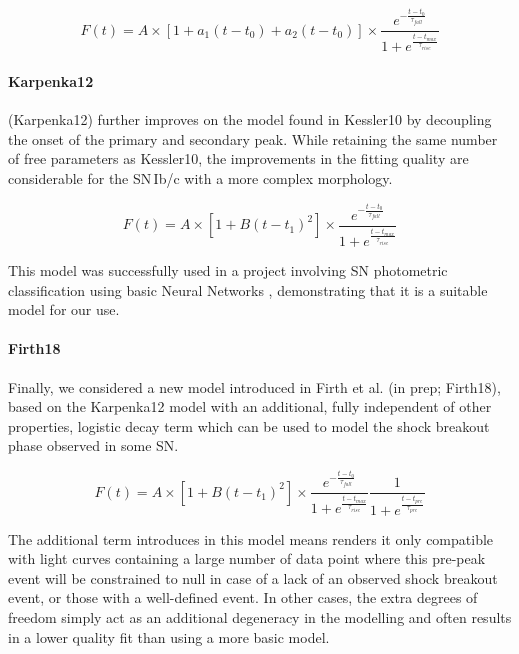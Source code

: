\begin{equation}
  F(t) = A \times [1 + a_1(t - {t_0}) + a_2(t - {t_0})] \times \frac{e^{-\frac{t - t_{0}}{\tau_{fall}}}} {1 + e^{\frac{t - t_{max}}{\tau_{rise}}}}
\end{equation}

\paragraph{Karpenka12}
\citet{Karpenka2012} (Karpenka12) further improves on the model found in Kessler10 by decoupling the onset of the primary and secondary peak. While retaining the same number of free parameters as Kessler10, the improvements in the fitting quality are considerable for the SN\,Ib/c with a more complex morphology.

\begin{equation}
  F(t) = A \times [1 + B(t - {t_1})^2] \times \frac{e^{-\frac{t - t_{0}}{\tau_{fall}}}} {1 + e^{\frac{t - t_{max}}{\tau_{rise}}}}
\end{equation}

This model was successfully used in a project involving SN photometric classification using basic Neural Networks \citep{Karpenka2012}, demonstrating that it is a suitable model for our use.

\paragraph{Firth18}
Finally, we considered a new model introduced in Firth et al. (in prep; Firth18), based on the Karpenka12 model with an additional, fully independent of other properties, logistic decay term which can be used to model the shock breakout phase observed in some SN.

\begin{equation}
  F(t) = A \times [1 + B(t - {t_1})^2] \times \frac{e^{-\frac{t - t_{0}}{\tau_{fall}}}} {1 + e^{\frac{t - t_{max}}{\tau_{rise}}}} \frac{1}{1 + e^{\frac{t - t_{pre}}{\tau_{pre}}}}
\end{equation}

The additional term introduces in this model means renders it only compatible with light curves containing a large number of data point where this pre-peak event will be constrained to null in case of a lack of an observed shock breakout event, or those with a well-defined event. In other cases, the extra degrees of freedom simply act as an additional degeneracy in the modelling and often results in a lower quality fit than using a more basic model.

